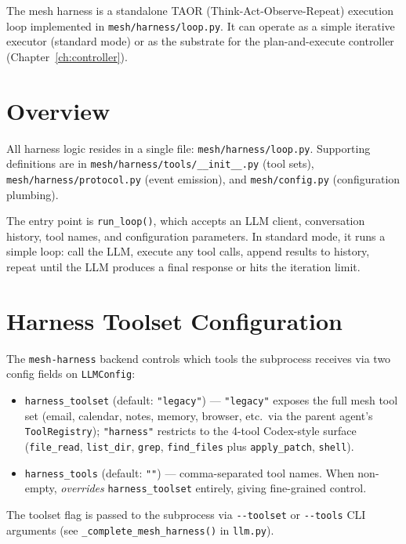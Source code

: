 \documentclass[11pt,letterpaper]{report}
\newcommand{\code}[1]{\texttt{#1}}
\begin{document}
The mesh harness is a standalone TAOR (Think-Act-Observe-Repeat)
execution loop implemented in \code{mesh/harness/loop.py}. It can
operate as a simple iterative executor (standard mode) or as the
substrate for the plan-and-execute controller
(Chapter~\ref{ch:controller}).

\section{Overview}

All harness logic resides in a single file:
\code{mesh/harness/loop.py}. Supporting definitions are in
\code{mesh/harness/tools/\_\_init\_\_.py} (tool sets),
\code{mesh/harness/protocol.py} (event emission), and
\code{mesh/config.py} (configuration plumbing).

The entry point is \code{run\_loop()}, which accepts an LLM client,
conversation history, tool names, and configuration parameters. In
standard mode, it runs a simple loop: call the LLM, execute any tool
calls, append results to history, repeat until the LLM produces a
final response or hits the iteration limit.

\section{Harness Toolset Configuration}
\label{sec:harness-toolset}

The \code{mesh-harness} backend controls which tools the subprocess
receives via two config fields on \code{LLMConfig}:

\begin{itemize}[nosep]
  \item \code{harness\_toolset} (default: \code{"legacy"}) ---
        \code{"legacy"} exposes the full mesh tool set (email, calendar,
        notes, memory, browser, etc.\ via the parent agent's
        \code{ToolRegistry}); \code{"harness"} restricts to the 4-tool
        Codex-style surface (\code{file\_read}, \code{list\_dir},
        \code{grep}, \code{find\_files} plus \code{apply\_patch},
        \code{shell}).
  \item \code{harness\_tools} (default: \code{""}) --- comma-separated
        tool names. When non-empty, \emph{overrides}
        \code{harness\_toolset} entirely, giving fine-grained control.
\end{itemize}

\noindent
The toolset flag is passed to the subprocess via \code{-{}-toolset} or
\code{-{}-tools} CLI arguments (see \code{\_complete\_mesh\_harness()}
in \code{llm.py}).
\end{document}
